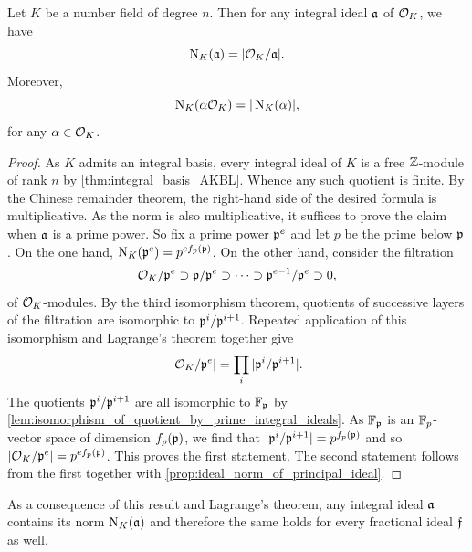       \begin{proposition}\label{prop:norm_and_field_norms_are_identical}
        Let \(K\) be a number field of degree \(n\). Then for any integral ideal \(\mathfrak{a}\) of \(\mathcal{O}_{K}\), we have
        \[
          \operatorname{\mathrm{N}}_{K}(\mathfrak{a}) = |\mathcal{O}_{K}/\mathfrak{a}|.
        \]
        Moreover,
        \[
          \operatorname{\mathrm{N}}_{K}(\alpha\mathcal{O}_{K}) = |\operatorname{\mathrm{N}}_{K}(\alpha)|,
        \]
        for any \(\alpha \in \mathcal{O}_{K}\).
      \end{proposition}
      \begin{proof}
        As \(K\) admits an integral basis, every integral ideal of \(K\) is a free \(\mathbb{Z}\)-module of rank \(n\) by \cref{thm:integral_basis_AKBL}. Whence any such quotient is finite. By the Chinese remainder theorem, the right-hand side of the desired formula is multiplicative. As the norm is also multiplicative, it suffices to prove the claim when \(\mathfrak{a}\) is a prime power. So fix a prime power \(\mathfrak{p}^{e}\) and let \(p\) be the prime below \(\mathfrak{p}\). On the one hand, \(\operatorname{\mathrm{N}}_{K}(\mathfrak{p}^{e}) = p^{ef_{p}(\mathfrak{p})}\). On the other hand, consider the filtration
        \[
          \mathcal{O}_{K}/\mathfrak{p}^{e} \supset \mathfrak{p}/\mathfrak{p}^{e} \supset \cdots \supset \mathfrak{p}^{e-1}/\mathfrak{p}^{e} \supset 0,
        \]
        of \(\mathcal{O}_{K}\)-modules. By the third isomorphism theorem, quotients of successive layers of the filtration are isomorphic to \(\mathfrak{p}^{i}/\mathfrak{p}^{i+1}\). Repeated application of this isomorphism and Lagrange's theorem together give
        \[
          |\mathcal{O}_{K}/\mathfrak{p}^{e}| = \prod_{i}|\mathfrak{p}^{i}/\mathfrak{p}^{i+1}|.
        \]
        The quotients \(\mathfrak{p}^{i}/\mathfrak{p}^{i+1}\) are all isomorphic to \(\mathbb{F}_{\mathfrak{p}}\) by \cref{lem:isomorphism_of_quotient_by_prime_integral_ideals}. As \(\mathbb{F}_{\mathfrak{p}}\) is an \(\mathbb{F}_{p}\)-vector space of dimension \(f_{p}(\mathfrak{p})\), we find that \(|\mathfrak{p}^{i}/\mathfrak{p}^{i+1}| = p^{f_{p}(\mathfrak{p})}\) and so \(|\mathcal{O}_{K}/\mathfrak{p}^{e}| = p^{ef_{p}(\mathfrak{p})}\). This proves the first statement. The second statement follows from the first together with \cref{prop:ideal_norm_of_principal_ideal}.
      \end{proof}

      As a consequence of this result and Lagrange's theorem, any integral ideal \(\mathfrak{a}\) contains its norm \(\operatorname{\mathrm{N}}_{K}(\mathfrak{a})\) and therefore the same holds for every fractional ideal \(\mathfrak{f}\) as well.
